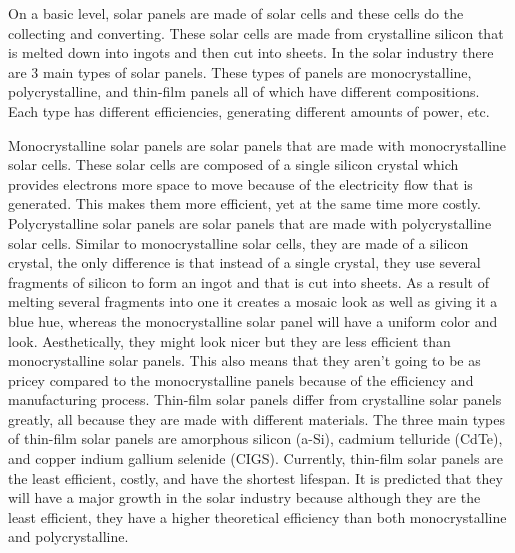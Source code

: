 On a basic level, solar panels are made of solar cells and these cells do the collecting and converting. These solar cells are made from crystalline silicon that is melted down into ingots and then cut into sheets. In the solar industry there are 3 main types of solar panels. These types of panels are monocrystalline, polycrystalline, and thin-film panels all of which have different compositions. Each type has different efficiencies, generating different amounts of power, etc.\par
Monocrystalline solar panels are solar panels that are made with monocrystalline solar cells. These solar cells are composed of a single silicon crystal which provides electrons more space to move because of the electricity flow that is generated. This makes them more efficient, yet at the same time more costly. Polycrystalline solar panels are solar panels that are made with polycrystalline solar cells. Similar to monocrystalline solar cells, they are made of a silicon crystal, the only difference is that instead of a single crystal, they use several fragments of silicon to form an ingot and that is cut into sheets. As a result of melting several fragments into one it creates a mosaic look as well as giving it a blue hue, whereas the monocrystalline solar panel will have a uniform color and look. Aesthetically, they might look nicer but they are less efficient than monocrystalline solar panels. This also means that they aren’t going to be as pricey compared to the monocrystalline panels because of the efficiency and manufacturing process. Thin-film solar panels differ from crystalline solar panels greatly, all because they are made with different materials. The three main types of thin-film solar panels are amorphous silicon (a-Si), cadmium telluride (CdTe), and copper indium gallium selenide (CIGS). Currently, thin-film solar panels are the least efficient, costly, and have the shortest lifespan. It is predicted that they will have a major growth in the solar industry because although they are the least efficient, they have a higher theoretical efficiency than both monocrystalline and polycrystalline. \par

